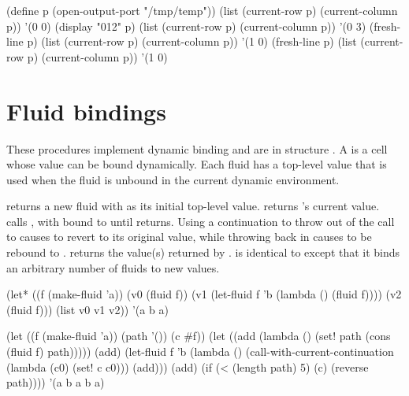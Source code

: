 \begin{example}
(define p (open-output-port "/tmp/temp"))
(list (current-row p) (current-column p))
    \evalsto '(0 0)
(display "012" p)
(list (current-row p) (current-column p))
    \evalsto '(0 3)
(fresh-line p)
(list (current-row p) (current-column p))
    \evalsto '(1 0)
(fresh-line p)
(list (current-row p) (current-column p))
    \evalsto '(1 0)
\end{example}

\section{Fluid bindings}

These procedures implement dynamic binding and are in structure .
A  is a cell whose value can be bound dynamically.
Each fluid has a top-level value that is used when the fluid
 is unbound in the current dynamic environment.

\begin{protos}
\end{protos}
\noindent
{} returns a new fluid with  as its initial
 top-level value.
 returns 's current value.
 calls , with  bound to 
 until  returns.
Using a continuation to throw out of the call to  causes
  to revert to its original value, while throwing back
 in causes  to be rebound to .
 returns the value(s) returned by .
 is identical to  except that it binds
 an arbitrary number of fluids to new values.

\begin{example}
(let* ((f (make-fluid 'a))
       (v0 (fluid f))
       (v1 (let-fluid f 'b
             (lambda ()
               (fluid f))))
       (v2 (fluid f)))
  (list v0 v1 v2))
  \evalsto '(a b a)
\end{example}

\begin{example}
(let ((f (make-fluid 'a))
      (path '())
      (c \#f))
  (let ((add (lambda ()
               (set! path (cons (fluid f) path)))))
    (add)
    (let-fluid f 'b
      (lambda ()
        (call-with-current-continuation
          (lambda (c0)
            (set! c c0)))
        (add)))
    (add)
    (if (< (length path) 5)
        (c)
        (reverse path))))
  \evalsto '(a b a b a)
\end{example}

